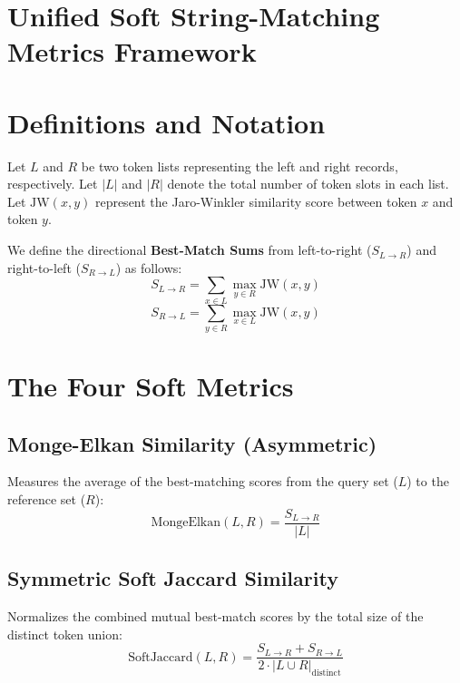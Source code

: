 \section{Unified Soft String-Matching Metrics Framework}
\label{annex:set_similarities_full}

\section{Definitions and Notation}
Let $L$ and $R$ be two token lists representing the left and right records, respectively.
Let $|L|$ and $|R|$ denote the total number of token slots in each list.
Let $\text{JW}(x, y)$ represent the Jaro-Winkler similarity score between token $x$ and token $y$.

We define the directional \textbf{Best-Match Sums} from left-to-right ($S_{L \to R}$) and right-to-left ($S_{R \to L}$) as follows:
\begin{equation}
	S_{L \to R} = \sum_{x \in L} \max_{y \in R} \text{JW}(x, y)
\end{equation}
\begin{equation}
	S_{R \to L} = \sum_{y \in R} \max_{x \in L} \text{JW}(x, y)
\end{equation}

\section{The Four Soft Metrics}

\subsection{Monge-Elkan Similarity (Asymmetric)}
Measures the average of the best-matching scores from the query set ($L$) to the reference set ($R$):
\begin{equation}
	\text{MongeElkan}(L, R) = \frac{S_{L \to R}}{|L|}
\end{equation}

\subsection{Symmetric Soft Jaccard Similarity}
Normalizes the combined mutual best-match scores by the total size of the distinct token union:
\begin{equation}
	\text{SoftJaccard}(L, R) = \frac{S_{L \to R} + S_{R \to L}}{2 \cdot |L \cup R|_{\text{distinct}}}
\end{equation}

